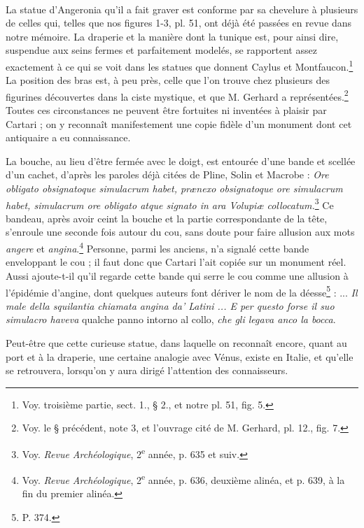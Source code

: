 \documentclass[a4paper, 11pt, oneside, polutonikogreek, french]{article}
\begin{document}
\paragraph{}
La statue d'Angeronia qu'il a fait graver est conforme par sa chevelure à plusieurs de celles qui, telles que nos figures 1-3, pl. 51, ont déjà été passées en revue dans notre mémoire. La draperie et la manière dont la tunique est, pour ainsi dire, suspendue aux seins fermes et parfaitement modelés, se rapportent assez exactement à ce qui se voit dans les statues que donnent Caylus et Montfaucon.\footnote{Voy. troisième partie, sect. 1., § 2., et notre pl. 51, fig. 5.} La position des bras est, à peu près, celle que l'on trouve chez plusieurs des figurines découvertes dans la ciste mystique, et que M. Gerhard a représentées.\footnote{Voy. le § précédent, note 3, et l'ouvrage cité de M. Gerhard, pl. 12., fig. 7.} Toutes ces circonstances ne peuvent être fortuites ni inventées à plaisir par Cartari ; on y reconnaît manifestement une copie fidèle d'un monument dont cet antiquaire a eu connaissance.

La bouche, au lieu d'être fermée avec le doigt, est entourée d'une bande et scellée d'un cachet, d'après les paroles déjà citées de Pline, Solin et Macrobe : \emph{Ore obligato obsignatoque simulacrum habet, prænexo obsignatoque ore simulacrum habet, simulacrum ore obligato atque signato in ara Volupiæ collocatum.}\footnote{Voy. \emph{Revue Archéologique}, 2\textsuperscript{e} année, p. 635 et suiv.} Ce bandeau, après avoir ceint la bouche et la partie correspondante de la tête, s'enroule une seconde fois autour du cou, sans doute pour faire allusion aux mots \emph{angere} et \emph{angina}.\footnote{Voy. \emph{Revue Archéologique}, 2\textsuperscript{e} année, p. 636, deuxième alinéa, et p. 639, à la fin du premier alinéa.} Personne, parmi les anciens, n'a signalé cette bande enveloppant le cou ; il faut donc que Cartari l'ait copiée sur un monument réel. Aussi ajoute-t-il qu'il regarde cette bande qui serre le cou comme une allusion à l'épidémie d'angine, dont quelques auteurs font dériver le nom de la déesse\footnote{P. 374.} : ... \emph{Il male della squilantia chiamata angina da' Latini ... E per questo forse il suo simulacro haveva} qualche panno intorno al collo, \emph{che gli legava anco la bocca}.

Peut-être que cette curieuse statue, dans laquelle on reconnaît encore, quant au port et à la draperie, une certaine analogie avec Vénus, existe en Italie, et qu'elle se retrouvera, lorsqu'on y aura dirigé l'attention des connaisseurs.
\end{document}
